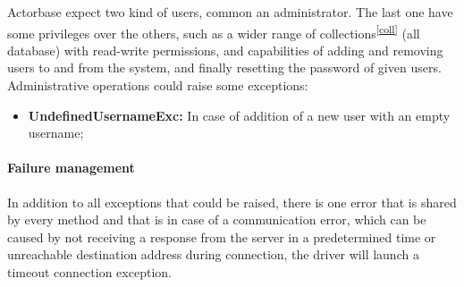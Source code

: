 \documentclass{scalatekids-article}
\begin{document}
Actorbase expect two kind of users, common an administrator. The last one have
some privileges over the others, such as a wider range of collections\textsuperscript{\ref{coll}} (all
database) with read-write permissions, and capabilities of adding and removing
users to and from the system, and finally resetting the password of given users.
Administrative operations could raise some exceptions:
\begin{itemize}
\item \textbf{UndefinedUsernameExc:} In case of addition of a new user with an empty username;
\end{itemize}

\paragraph{Failure management}

In addition to all exceptions that could be raised, there is one error that is
shared by every method and that is in case of a communication error, which can
be caused by not receiving a response from the server in a predetermined time or
unreachable destination address during connection, the driver will launch a
timeout connection exception.
\end{document}
